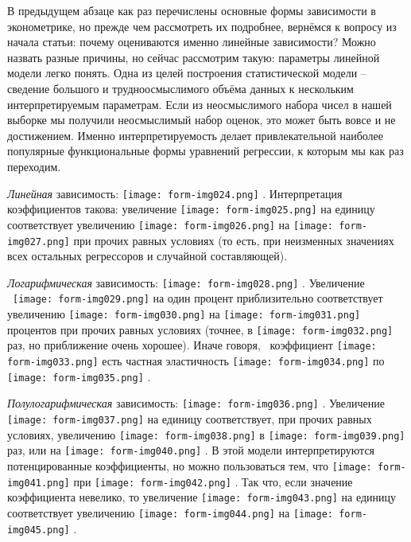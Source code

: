 \documentclass[a4paper]{article}
\begin{document}
В предыдущем абзаце как раз перечислены основные формы зависимости в эконометрике, но прежде чем рассмотреть их подробнее, вернёмся к вопросу из начала статьи: почему оцениваются именно линейные зависимости? Можно назвать разные причины, но сейчас рассмотрим такую: параметры линейной модели легко понять. Одна из целей построения статистической модели – сведение большого и трудноосмыслимого объёма данных к нескольким интерпретируемым параметрам. Если из неосмыслимого набора чисел в нашей выборке мы получили неосмыслимый набор оценок, это может быть вовсе и не достижением. Именно интерпретируемость делает привлекательной наиболее популярные функциональные формы уравнений регрессии, к которым мы как раз переходим.

\textit{Линейная} зависимость: \texttt{[image: form-img024.png]} . Интерпретация коэффициентов такова: увеличение  \texttt{[image: form-img025.png]}  на единицу соответствует увеличению  \texttt{[image: form-img026.png]}  на  \texttt{[image: form-img027.png]}  при прочих равных условиях (то есть, при неизменных значениях всех остальных регрессоров и случайной составляющей). 

\textit{Логарифмическая} зависимость:  \texttt{[image: form-img028.png]} . Увеличение \  \texttt{[image: form-img029.png]}  на один процент приблизительно соответствует увеличению  \texttt{[image: form-img030.png]}  на  \texttt{[image: form-img031.png]}  процентов при прочих равных условиях (точнее, в  \texttt{[image: form-img032.png]}  раз, но приближение очень хорошее). Иначе говоря, \ коэффициент  \texttt{[image: form-img033.png]}  есть частная эластичность  \texttt{[image: form-img034.png]}  по  \texttt{[image: form-img035.png]} .

\textit{Полулогарифмическая }зависимость:  \texttt{[image: form-img036.png]} . Увеличение  \texttt{[image: form-img037.png]}  на единицу соответствует, при прочих равных условиях, увеличению  \texttt{[image: form-img038.png]}  в  \texttt{[image: form-img039.png]}  раз, или на  \texttt{[image: form-img040.png]} . В этой модели интерпретируются потенцированные коэффициенты, но можно пользоваться тем, что  \texttt{[image: form-img041.png]}  при  \texttt{[image: form-img042.png]} . Так что, если значение коэффициента невелико, то увеличение  \texttt{[image: form-img043.png]}  на единицу соответствует увеличению  \texttt{[image: form-img044.png]}  на  \texttt{[image: form-img045.png]} .
\end{document}
